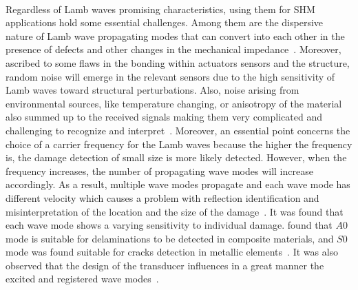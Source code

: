 \paragraph{}
Regardless of Lamb waves promising characteristics, using them for SHM 
applications hold some essential challenges. 
Among them are the dispersive nature of Lamb wave propagating modes that can convert into each other in the presence of defects and other changes in the mechanical 
impedance~\cite{Willberg2015}. 
Moreover, ascribed to some flaws in the bonding within actuators sensors and 
the structure, random noise will emerge in the relevant sensors due to the high 
sensitivity of Lamb waves toward structural perturbations. 
Also, noise arising from environmental sources, like temperature changing, or 
anisotropy of the material also summed up to the received signals making them 
very complicated and challenging to recognize and interpret~\cite{Willberg2015}.
Moreover, an essential point concerns the choice of a carrier frequency for the 
Lamb waves because the higher the frequency is, the damage detection of small 
size is more likely detected.
However,  when the frequency increases, the number of propagating wave modes will increase accordingly.
As a result, multiple wave modes propagate and each wave mode has different velocity which causes a problem with reflection identification and misinterpretation of the location and the size of the damage~\cite{Ostachowicz2012}. 
It was found that each wave mode shows a varying sensitivity to individual 
damage. 
\textcite{Kessler2002b,Ihn2008} found that \(A0\) mode is suitable for delaminations to be detected in composite materials, and \(S0\) mode was found suitable for cracks detection in metallic elements~\cite{Ihn2004,Ihn2008}.
It was also observed that the design of the transducer influences in a great manner the excited and registered wave modes~\cite{Ostachowicz2010}.